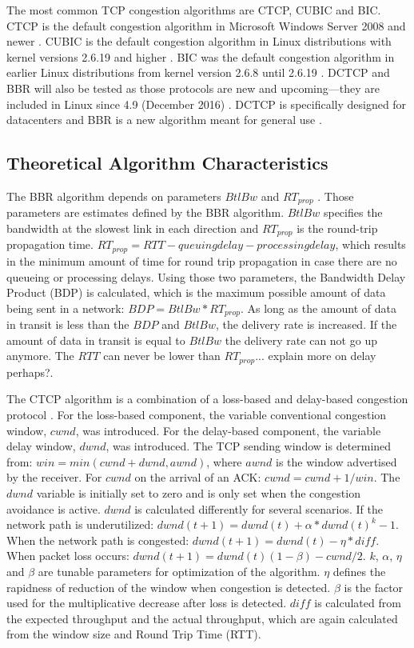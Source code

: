 \documentclass{article}
\begin{document}
The most common TCP congestion algorithms are CTCP, CUBIC and BIC. CTCP is the default congestion algorithm in Microsoft Windows Server 2008 and newer \cite{cubic-kernel-version}. CUBIC is the default congestion algorithm in Linux distributions with kernel versions 2.6.19 and higher \cite{cubic-kernel-version}. BIC was the default congestion algorithm in earlier Linux distributions from kernel version 2.6.8 until 2.6.19 \cite{bic-kernel-version} \cite{cubic-kernel-version}. DCTCP and BBR will also be tested as those protocols are new and upcoming---they are included in Linux since 4.9 (December 2016) \cite{linux-bbr}. DCTCP is specifically designed for datacenters \cite{dctcp-congestion} and BBR is a new algorithm meant for general use \cite{bbr-congestion}.


\subsection{Theoretical Algorithm Characteristics}\label{sub:algos-theoretical}

The BBR algorithm depends on parameters $BtlBw$ and $RT_{prop}$ \cite{bbr-congestion}. Those parameters are estimates defined by the BBR algorithm. $BtlBw$ specifies the bandwidth at the slowest link in each direction and $RT_{prop}$ is the round-trip propagation time. $RT_{prop} = RTT - queuing delay - processing delay$, which results in the minimum amount of time for round trip propagation in case there are no queueing or processing delays. Using those two parameters, the Bandwidth Delay Product (BDP) is calculated, which is the maximum possible amount of data being sent in a network: $BDP = BtlBw * RT_{prop}$. As long as the amount of data in transit is less than the $BDP$ and $BtlBw$, the delivery rate is increased. If the amount of data in transit is equal to $BtlBw$ the delivery rate can not go up anymore. The $RTT$ can never be lower than $RT_{prop}$... explain more on delay perhaps?.

The CTCP algorithm is a combination of a loss-based and delay-based congestion protocol \cite{compound-tcp-congestion}. For the loss-based component, the variable conventional congestion window, $cwnd$, was introduced. For the delay-based component, the variable delay window, $dwnd$, was introduced. The TCP sending window is determined from: $win = min(cwnd + dwnd, awnd)$, where $awnd$ is the window advertised by the receiver. For $cwnd$ on the arrival of an ACK: $cwnd = cwnd + 1/win$. The $dwnd$ variable is initially set to zero and is only set when the congestion avoidance is active. $dwnd$ is calculated differently for several scenarios. If the network path is underutilized: $dwnd(t+1) = dwnd(t) + \alpha*dwnd(t)^{k} - 1$. When the network path is congested: $dwnd(t+1) = dwnd(t) - \eta*diff$. When packet loss occurs: $dwnd(t+1) = dwnd(t)(1-\beta) - cwnd/2$. $k$, $\alpha$, $\eta$ and $\beta$ are tunable parameters for optimization of the algorithm. $\eta$ defines the rapidness of reduction of the window when congestion is detected. $\beta$ is the factor used for the multiplicative decrease after loss is detected. $diff$ is calculated from the expected throughput and the actual throughput, which are again calculated from the window size and Round Trip Time (RTT).
\end{document}
